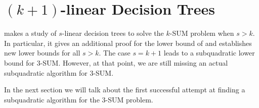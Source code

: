 \section{$(k+1)$-linear Decision Trees}

\cite{ailon:2005} makes a study of $s$-linear decision trees to solve the $k$-SUM
problem when $s > k$. In particular, it gives an additional proof for the
 lower bound of \cite{erickson:1999} and
establishes new lower bounds for all $s > k$. The case $s = k+1$ leads to a
subquadratic lower bound for $3$-SUM. However, at that point, we are still
missing an actual subquadratic algorithm for $3$-SUM.

In the next section we will talk about the first successful attempt at finding
a subquadratic algorithm for the $3$-SUM problem.
